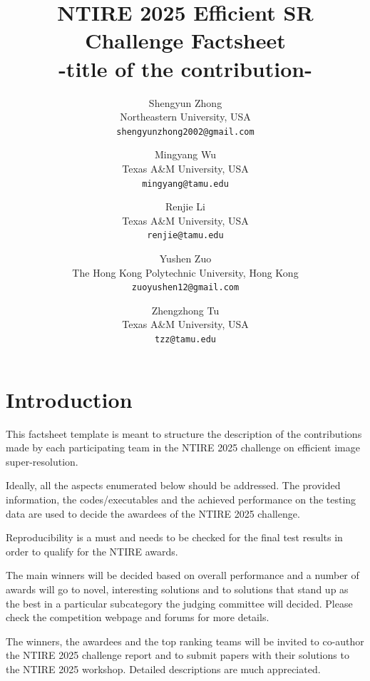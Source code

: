 \documentclass[10pt,twocolumn,letterpaper]{article}
\begin{document}
\title{NTIRE 2025 Efficient SR Challenge Factsheet\\-title of the contribution-}

\author{
Shengyun Zhong\\
Northeastern University, USA\\
{\tt\small shengyunzhong2002@gmail.com}
\and
Mingyang Wu\\
Texas A\&M University, USA\\
{\tt\small mingyang@tamu.edu}
\and
Renjie Li\\
Texas A\&M University, USA\\
{\tt\small renjie@tamu.edu}
\and
Yushen Zuo\\
The Hong Kong Polytechnic University, Hong Kong\\
{\tt\small zuoyushen12@gmail.com}
\and
Zhengzhong Tu\\
Texas A\&M University, USA\\
{\tt\small tzz@tamu.edu}
}
\maketitle


\section{Introduction}

This factsheet template is meant to structure the description of the contributions made by each participating team in the NTIRE 2025 challenge on efficient image super-resolution. 

Ideally, all the aspects enumerated below should be addressed.
The provided information, the codes/executables and the achieved performance on the testing data are used to decide the awardees of the NTIRE 2025 challenge. 

Reproducibility is a must and needs to be checked for the final test results in order to qualify for the NTIRE awards. 

The main winners will be decided based on overall performance and a number of awards will go to novel, interesting solutions and to solutions that stand up as the best in a particular subcategory the judging committee will decided. Please check the competition webpage and forums for more details.

The winners, the awardees and the top ranking teams will be invited to co-author the NTIRE 2025 challenge report and to submit papers with their solutions to the NTIRE 2025 workshop. Detailed descriptions are much appreciated.
\end{document}
